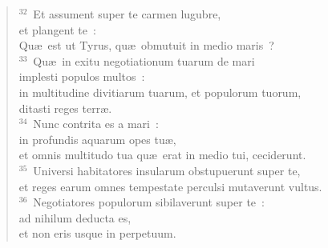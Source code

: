 \begin{verse}
${}^{32}$~Et assument super te carmen lugubre,\\ et plangent te~:\\ Qu\ae\ est ut Tyrus, qu\ae\ obmutuit in medio maris~?\\
${}^{33}$~Qu\ae\ in exitu negotiationum tuarum de mari\\ implesti populos multos~:\\ in multitudine divitiarum tuarum, et populorum tuorum,\\ ditasti reges terr\ae .\\
${}^{34}$~Nunc contrita es a mari~:\\ in profundis aquarum opes tu\ae ,\\ et omnis multitudo tua qu\ae\ erat in medio tui, ceciderunt.\\
${}^{35}$~Universi habitatores insularum obstupuerunt super te,\\ et reges earum omnes tempestate perculsi mutaverunt vultus.\\
${}^{36}$~Negotiatores populorum sibilaverunt super te~:\\ ad nihilum deducta es,\\ et non eris usque in perpetuum.\end{verse}



